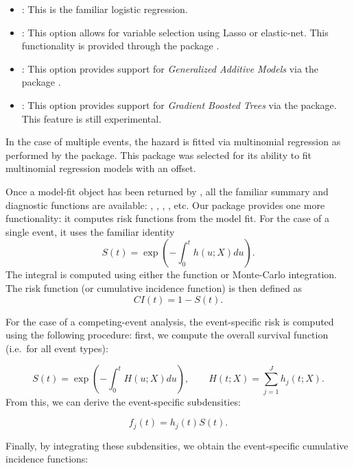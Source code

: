 \documentclass[
]{jss}
\providecommand{\tightlist}{%
  \setlength{\itemsep}{0pt}\setlength{\parskip}{0pt}}
\begin{document}
\begin{itemize}
\tightlist
\item
  : This is the familiar logistic regression.
\item
  : This option allows for variable selection using Lasso
  or elastic-net. This functionality is provided through the
   package \citep{friedman2010jss}.
\item
  : This option provides support for \emph{Generalized
  Additive Models} via the  package
  \citep{hastie1987generalized}.
\item
  : This option provides support for \emph{Gradient Boosted
  Trees} via the  package. This feature is still experimental.
\end{itemize}

In the case of multiple events, the hazard is fitted via multinomial
regression as performed by the  package. This package was
selected for its ability to fit multinomial regression models with an
offset.

Once a model-fit object has been returned by , all
the familiar summary and diagnostic functions are available:
, , , , etc. Our
package provides one more functionality: it computes risk functions from
the model fit. For the case of a single event, it uses the familiar
identity \begin{equation}\label{eqn:surv}
S(t) = \exp\left(-\int_0^t h(u;X) du\right).
\end{equation} The integral is computed using either the
 function or Monte-Carlo integration. The risk
function (or cumulative incidence function) is then defined as
\begin{equation}\label{eqn:CI}
CI(t) = 1 - S(t).
\end{equation}

For the case of a competing-event analysis, the event-specific risk is
computed using the following procedure: first, we compute the overall
survival function (i.e.~for all event types):

\[ S(t) = \exp\left(-\int_0^t H(u;X) du\right),\qquad H(t;X) = \sum_{j=1}^J h_j(t;X).\]
From this, we can derive the event-specific subdensities:

\[ f_j(t) = h_j(t)S(t).\]

Finally, by integrating these subdensities, we obtain the event-specific
cumulative incidence functions:
\end{document}
